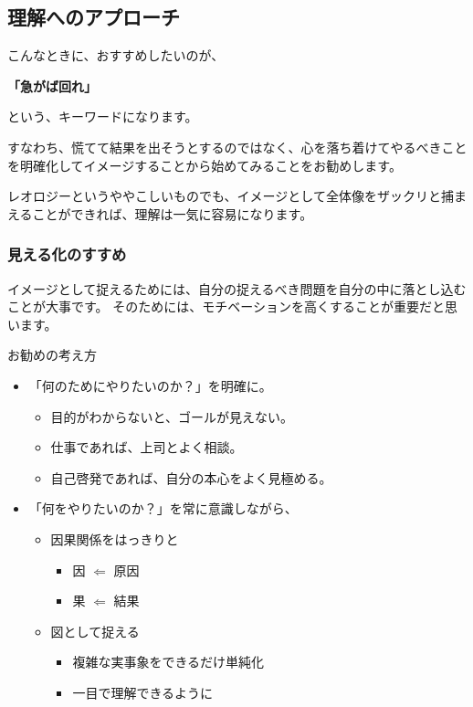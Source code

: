 \documentclass[uplatex,dvipdfmx,a4paper,11pt]{jsarticle}
\begin{document}
\subsection{理解へのアプローチ}
こんなときに、おすすめしたいのが、
\begin{center}
	\Huge{\bf「急がば回れ」}
\end{center}
という、キーワードになります。

すなわち、慌てて結果を出そうとするのではなく、心を落ち着けてやるべきことを明確化してイメージすることから始めてみることをお勧めします。

レオロジーというややこしいものでも、イメージとして全体像をザックリと捕まえることができれば、理解は一気に容易になります。

\subsubsection{見える化のすすめ}

イメージとして捉えるためには、自分の捉えるべき問題を自分の中に落とし込むことが大事です。
そのためには、モチベーションを高くすることが重要だと思います。
\large
\begin{itembox}[l]{お勧めの考え方}
	\begin{itemize}
		\item 「何のためにやりたいのか？」を明確に。
		\begin{itemize}
			\item 目的がわからないと、ゴールが見えない。
			\item 仕事であれば、上司とよく相談。
			\item 自己啓発であれば、自分の本心をよく見極める。
		\end{itemize}
		\item 「何をやりたいのか？」を常に意識しながら、
		\begin{itemize}
			\item 因果関係をはっきりと
			\begin{itemize}
				\item 因 $\Leftarrow$ 原因
				\item 果 $\Leftarrow$ 結果
			\end{itemize}
			\item 図として捉える
			\begin{itemize}
				\item 複雑な実事象をできるだけ単純化
				\item 一目で理解できるように  
			\end{itemize}
		\end{itemize}
	\end{itemize}
\end{itembox}
\normalsize
\end{document}
